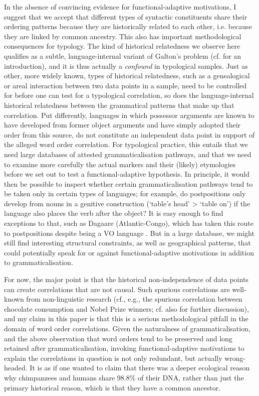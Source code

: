 \documentclass[output=paper]{langsci/langscibook}
\begin{document}
In the absence of convincing evidence for functional-adaptive motivations, I suggest that we accept that different types of syntactic constituents share their ordering patterns because they are historically related to each other, i.e. because they are linked by common ancestry. This also has important methodological consequences for typology. The kind of historical relatedness we observe here qualifies as a subtle, language-internal variant of Galton’s problem (cf. \citealt{Cysouw2011} for an introduction), and it is thus actually a \textit{confound} in typological samples. Just as other, more widely known, types of historical relatedness, such as a genealogical or areal interaction between two data points in a sample, need to be controlled for before one can test for a typological correlation, so does the language-internal historical relatedness between the grammatical patterns that make up that correlation. Put differently, languages in which possessor arguments are known to have developed from former object arguments and have simply adopted their order from this source, do not constitute an independent data point in support of the alleged word order correlation. For typological practice, this entails that we need large databases
\label{pg:collins:refforhaspelmath}
of attested grammaticalisation pathways, and that we need to examine more carefully the actual markers and their (likely) etymologies before we set out to test a functional-adaptive hypothesis. In principle, it would then be possible to inspect whether certain grammaticalisation pathways tend to be taken only in certain types of languages; for example, do postpositions only develop from nouns in a genitive construction (‘table's head’ > ‘table on’) if the language also places the verb after the object? It is easy enough to find exceptions to that, such as Dagaare (Atlantic-Congo), which has taken this route to postpositions despite being a VO language \citep{Bodomo1997}. But in a large database, we might still find interesting structural constraints, as well as geographical patterns, that could potentially speak for or against functional-adaptive motivations in addition to grammaticalisation. 

For now, the major point is that the historical non-independence of data points can create correlations that are not causal. Such spurious correlations are well-known from non-linguistic research (cf., e.g., the spurious correlation between chocolate consumption and Nobel Prize winners; cf. also \citealt{RobertsWinters2013} for further discussion), and my claim in this paper is that this is a serious methodological pitfall in the domain of word order correlations. Given the naturalness of grammaticalisation, and the above observation that word orders tend to be preserved and long retained after grammaticalisation, invoking functional-adaptive motivations to explain the correlations in question is not only redundant, but actually wrong-headed. It is as if one wanted to claim that there was a deeper ecological reason why chimpanzees and humans share 98.8\% of their DNA, rather than just the primary historical reason, which is that they have a common ancestor.
\end{document}
